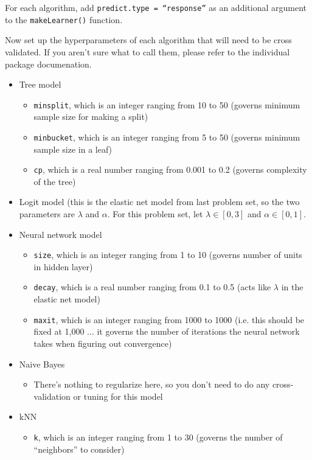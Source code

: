 \documentclass[12pt,english]{exam}
\begin{document}
\begin{questions}
\begin{itemize}
For each algorithm, add \texttt{predict.type = ``response''} as an additional argument to the \texttt{makeLearner()} function.

\end{itemize}

\question Now set up the hyperparameters of each algorithm that will need to be cross validated. If you aren't sure what to call them, please refer to the individual package documenation.
\begin{itemize}
\item Tree model
    \begin{itemize}
    \item \texttt{minsplit}, which is an integer ranging from 10 to 50 (governs minimum sample size for making a split)
    \item \texttt{minbucket}, which is an integer ranging from 5 to 50 (governs minimum sample size in a leaf)
    \item \texttt{cp}, which is a real number ranging from 0.001 to 0.2 (governs complexity of the tree)
    \end{itemize}
\item Logit model (this is the elastic net model from last problem set, so the two parameters are $\lambda$ and $\alpha$. For this problem set, let $\lambda\in\left[0,3\right]$ and $\alpha\in\left[0,1\right]$.
\item Neural network model
    \begin{itemize}
    \item \texttt{size}, which is an integer ranging from 1 to 10 (governs number of units in hidden layer)
    \item \texttt{decay}, which is a real number ranging from 0.1 to 0.5 (acts like $\lambda$ in the elastic net model)
    \item \texttt{maxit}, which is an integer ranging from 1000 to 1000 (i.e. this should be fixed at 1,000 ... it governs the number of iterations the neural network takes when figuring out convergence)
    \end{itemize}
\item Naive Bayes
    \begin{itemize}
    \item There's nothing to regularize here, so you don't need to do any cross-validation or tuning for this model
    \end{itemize}
\item kNN
    \begin{itemize}
    \item \texttt{k}, which is an integer ranging from 1 to 30 (governs the number of ``neighbors'' to consider)

\end{itemize}
\end{itemize}
\end{questions}
\end{document}
